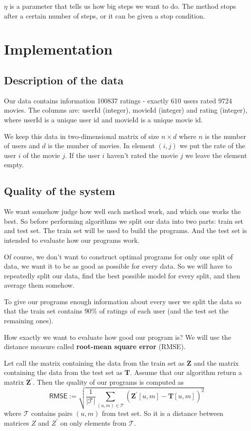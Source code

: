 \documentclass[10pt]{amsart}
\begin{document}
$\eta$ is a parameter that tells us how big steps we want to do.
The method stops after a certain number of steps, or it can be given a stop condition.

\section{Implementation}

\subsection*{Description of the data}

Our data contains information 100837 ratings - exactly 610 users rated 9724 movies.
The columns are: \textsf{userId} (integer), \textsf{movieId} (integer) and \textsf{rating} (integer), where \textsf{userId} is a unique user id and \textsf{movieId} is a unique movie id.


We keep this data in two-dimensional matrix of size $n \times d$ where $n$ is the number of users and $d$ is the number of movies.
In element $(i,j)$ we put the rate of the user $i$ of the movie $j$.
If the user $i$ haven't rated the movie $j$ we leave the element empty.


\subsection*{Quality of the system}
We want somehow judge how well each method work, and which one works the best.
So before performing algorithms we split our data into two parts: train set and test set.
The train set will be used to build the programs.
And the test set is intended to evaluate how our programs work.

Of course, we don't want to construct optimal programs for only one split of data, we want it to be as good as possible for every data.
So we will have to repeatedly split our data, find the best possible model for every split, and then average them somehow.

To give our programs enough information about every user we split the data so that the train set contains 90\% of ratings of each user (and the test set the remaining ones).

How exactly we want to evaluate how good our program is?
We will use the distance measure called \textbf{root-mean square error} (RMSE).

Let call the matrix containing the data from the train set as $\boldsymbol{Z}$ and the matrix containing the data from the test set as $\boldsymbol{T}$.
Assume that our algorithm return a matrix $\boldsymbol{Z}^{'}$.
Then the quality of our programs is computed as
\[\textsf{RMSE} :=
\sqrt{\frac{1}{|\mathcal{T}|} \sum_{(u,m) \in \mathcal{T}} \left(\boldsymbol{Z}^{'}[u,m] - \boldsymbol{T}[u,m] \right)^2}\]
where $\mathcal{T}$ contains pairs $(u,m)$ from test set.
So it is a distance between matrices $Z$ and $Z^{'}$ on only elements from $\mathcal{T}$.
\end{document}
